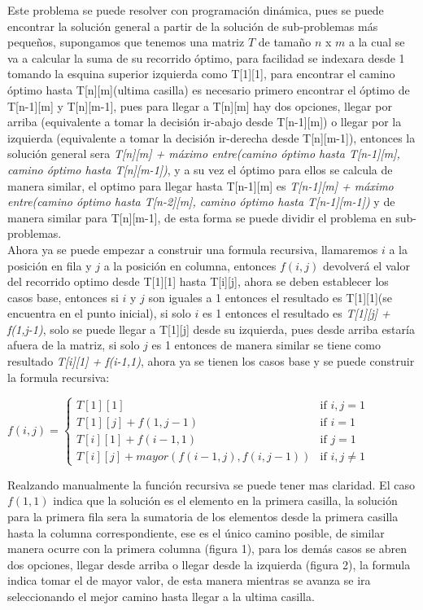 \documentclass[12pt, a4paper]{article}
\begin{document}
	Este problema se puede resolver con programación dinámica, pues se puede encontrar la solución general a partir de 
	la solución de sub-problemas más pequeños, supongamos que tenemos una matriz $T$ de tamaño $n$ x $m$ a la cual se 
	va a calcular la suma de su recorrido óptimo, para facilidad se indexara desde 1 tomando la esquina superior
	izquierda como T[1][1], para encontrar el camino óptimo hasta T[n][m](ultima casilla) es necesario primero 
	encontrar el óptimo de T[n-1][m] y T[n][m-1], pues para llegar a T[n][m] hay dos opciones, llegar por arriba
	(equivalente a tomar la decisión ir-abajo desde T[n-1][m]) o llegar por la izquierda (equivalente a tomar la 
	decisión ir-derecha desde T[n][m-1]), entonces la solución general sera \textit{T[n][m] + máximo entre(camino 
	óptimo hasta T[n-1][m], camino óptimo hasta T[n][m-1])}, y a su vez el óptimo para ellos se calcula de manera
	similar, el  optimo para llegar hasta T[n-1][m] es \textit{T[n-1][m] + máximo entre(camino óptimo hasta T[n-2][m],
	camino óptimo hasta T[n-1][m-1])} y  de manera similar para T[n][m-1], de esta forma se puede dividir el problema 
	en sub-problemas.\\
	
	Ahora ya se puede empezar a construir una formula recursiva, llamaremos $i$ a la posición en fila y $j$ a la 
	posición en columna, entonces $f(i,j)$ devolverá el valor del recorrido optimo desde T[1][1] hasta T[i][j], 
	ahora se deben establecer los casos base, entonces si $i$ y $j$ son iguales a 1 entonces el resultado es 
	T[1][1](se encuentra en el punto inicial), si solo $i$ es 1 entonces el resultado es \textit{T[1][j] + f(1,j-1)},
	solo se puede llegar a T[1][j] desde su izquierda, pues desde arriba estaría afuera de la matriz, si solo $j$ 
	es 1 entonces de manera similar se tiene como resultado \textit{T[i][1] + f(i-1,1)}, ahora ya se tienen los 
	casos base y se puede construir la formula recursiva:
	\begin{center}
		$f(i, j) = 	
		\begin{cases}
			T[1][1] & \text{if $i,j = 1$}\\
			T[1][j] + f(1, j-1) & \text{if $i = 1$}\\
			T[i][1] + f(i-1, 1) & \text{if $j = 1$}\\
			T[i][j] + mayor(f(i-1, j), f(i, j-1)) & \text{if $i,j \neq 1$}
		\end{cases}
	$\\
	\end{center}
	Realzando manualmente la función recursiva se puede tener mas claridad. El caso $f(1,1)$ indica que la solución
	es el elemento en la primera casilla, la solución para la primera fila sera la sumatoria de los elementos desde 
	la primera casilla hasta la columna correspondiente, ese es el único camino posible, de similar manera ocurre
	con la primera columna (figura 1), para los demás casos se abren dos opciones, llegar desde arriba o llegar desde
	la izquierda (figura 2), la formula indica tomar el de mayor valor, de esta manera mientras se avanza se ira 
	seleccionando el mejor camino hasta llegar a la ultima casilla.\\
	
\end{document}
